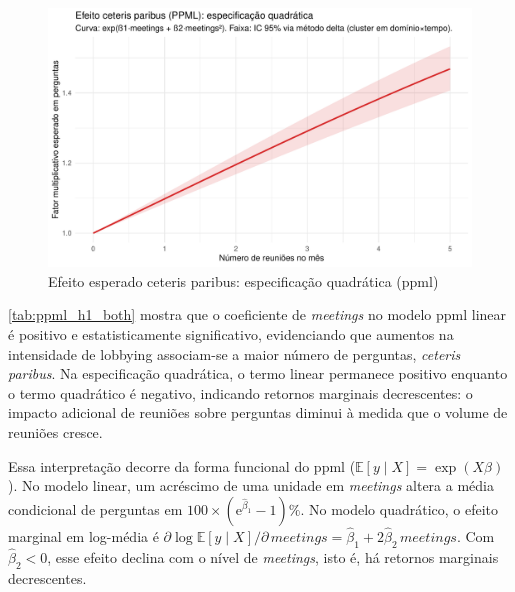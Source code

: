 \begin{figure}[htbp]
\centering
\includegraphics[width=\textwidth]{figures/fig9_effect_quadratic_ppml.pdf}
\caption{Efeito esperado ceteris paribus: especificação quadrática (\acrshort{ppml})}
\label{fig:effect_quadratic_ppml}
\end{figure}

\autoref{tab:ppml_h1_both} mostra que o coeficiente de \textit{meetings} no modelo \acrshort{ppml} linear é positivo e estatisticamente significativo, evidenciando que aumentos na intensidade de lobbying associam-se a maior número de perguntas, \textit{ceteris paribus}. Na especificação quadrática, o termo linear permanece positivo enquanto o termo quadrático é negativo, indicando retornos marginais decrescentes: o impacto adicional de reuniões sobre perguntas diminui à medida que o volume de reuniões cresce.

Essa interpretação decorre da forma funcional do \acrshort{ppml} (\(\mathbb{E}[y\mid X]=\exp(X\beta)\)). No modelo linear, um acréscimo de uma unidade em \textit{meetings} altera a média condicional de perguntas em \(100\times(\mathrm{e}^{\hat{\beta}_1}-1)\%\). No modelo quadrático, o efeito marginal em log-média é \(\partial\log\mathbb{E}[y\mid X]/\partial\,\textit{meetings}=\hat{\beta}_1+2\hat{\beta}_2\,\textit{meetings}\). Com \(\hat{\beta}_2<0\), esse efeito declina com o nível de \textit{meetings}, isto é, há retornos marginais decrescentes. 


